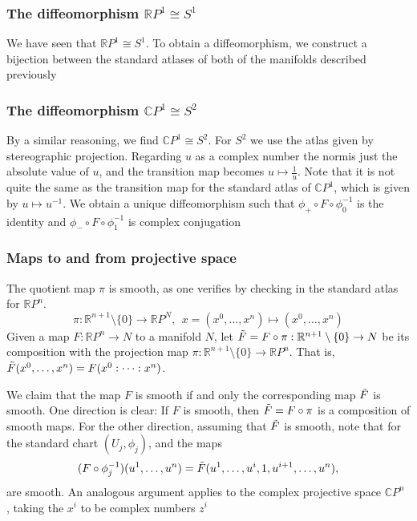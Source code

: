 \documentclass{article}
\theoremstyle{definition}
\begin{document}
\subsubsection{The diffeomorphism \texorpdfstring{$\mathbb R P^1 \cong S^1$}{RP1 ∼= S1} }

We have seen that $\mathbb R P^1 \cong S^1$. To obtain a diffeomorphism, we construct a bijection between the standard atlases of both of the manifolds described previously

\subsubsection{The diffeomorphism \texorpdfstring{$\mathbb C P^1 \cong S^2$}{CP1 ∼= S2}}

By a similar reasoning, we find $\mathbb C P^1 \cong S^2$. For $S^2$ we use the atlas given by stereographic projection.  Regarding $u$ as a complex number the normis just the absolute value of $u$, and the transition map becomes $u \mapsto \frac{1}{u}$. Note that it is not quite the same as the transition map for the standard atlas of $\mathbb C P^1$,
which is given by $u \mapsto u^{-1}$. We obtain a unique diffeomorphism such that $\phi_+ \circ F \circ \phi_0^{-1}$ is the identity and $\phi_- \circ F \circ \phi_1^{-1}$ is complex conjugation

\subsubsection{Maps to and from projective space}

The quotient map $\pi$ is smooth, as one verifies by checking in the standard atlas for $\mathbb R P^n$.
\[
    \pi : \mathbb R^{n+1} \setminus \{0\} \rightarrow \mathbb R P^N, \ \ 
    x = (x^0, \dots, x^n) \mapsto (x^0, \dots, x^n)
\]
Given a map $F : \mathbb R P^n \rightarrow N$ to a manifold $N$, let $\Tilde{F} = F \circ \pi : \mathbb R ^{n+1}\setminus \{0\} \rightarrow N$ be its composition with the projection map $\pi : \mathbb R ^{n+1}\setminus \{0\} \rightarrow \mathbb R P^n$. That is, $\Tilde{F} (x^0 , \dots, x^n ) = F(x^0 : \dots : x^n )$.

We claim that the map $F$ is smooth if and only the corresponding map $\Tilde{F}$ is smooth. One direction is clear: If $F$ is smooth, then $\Tilde{F} = F \circ \pi$ is a composition of smooth maps. For the other direction, assuming that $\Tilde{F}$ is smooth, note that for the standard chart $(U_j ,\phi_j)$, and the maps
\[
    (F \circ \phi^{-1}_j )(u^1 ,\dots, u^n ) = \Tilde{F}(u^1 ,\dots, u^i ,1,u ^{i+1} ,\dots,u^n ),
\] are smooth. An analogous argument applies to the complex projective space $\mathbb C P^n$ , taking the $x^i$ to be complex numbers $z^i$
 
\end{document}
